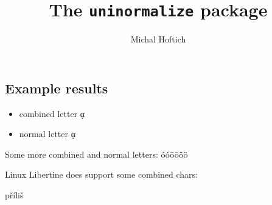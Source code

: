 \documentclass{article}
\begin{document}
\title{The \texttt{uninormalize} package}
\author{Michal Hoftich}
\maketitle



\subsection{Example results}

\begin{itemize}
  \item combined letter ᾳ %
  \item normal letter ᾳ%
\end{itemize}

Some more combined and normal letters: 
óóōōöö

Linux Libertine does support some combined chars: \parbox{4em}{příliš}
\end{document}
